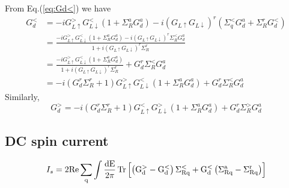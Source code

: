 \documentclass[11pt,a4paper]{article}
\begin{document}
From Eq.(\ref{eq:Gd<}) we have
\begin{equation}
\begin{split}
G_{d}^{<}&=-i G_{L \uparrow}^{>} G_{L \downarrow}^{<}\left(1+\Sigma_{R}^{a} G_{d}^{a}\right)-i\left(G_{L \uparrow} G_{L \downarrow}\right)^{r}\left(\Sigma_{q}^{<} G_{d}^{a}+\Sigma_{R}^{r} G_{d}^{<}\right)\\
&=\frac{-i G_{L \uparrow}^{>} G_{L \downarrow}^{<}\left(1+\Sigma_{R}^{a} G_{d}^{a}\right) - i\left(G_{L \uparrow} G_{L \downarrow}\right)^{r}\Sigma_{R}^{<} G_{d}^{a}}{1+i\left(G_{L \uparrow} G_{L \downarrow}\right)^{r}\Sigma_{R}^{r}} \\
&=\frac{-i G_{L \uparrow}^{>} G_{L \downarrow}^{<}\left(1+\Sigma_{R}^{a} G_{d}^{a}\right)}{1+i\left(G_{L \uparrow} G_{L \downarrow}\right)^{r}\Sigma_{R}^{r}} + G_{d}^{r}\Sigma_{R}^{<} G_{d}^{a}\\
&=-i(G_{d}^{r}\Sigma_{R}^{r}+1) G_{L \uparrow}^{>} G_{L \downarrow}^{<}\left(1+\Sigma_{R}^{a} G_{d}^{a}\right) + G_{d}^{r}\Sigma_{R}^{<} G_{d}^{a}
\end{split}
\end{equation}
Similarly,
\begin{equation}
G_{d}^{>}=-i\left(G_{d}^{r} \Sigma_{R}^{r}+1\right) G_{L \uparrow}^{<} G_{L \downarrow}^{>}\left(1+\Sigma_{R}^{a} G_{d}^{a}\right)+G_{d}^{r} \Sigma_{R}^{>} G_{d}^{a}
\end{equation}
\subsection{DC spin current}

\begin{equation}
I_{s}= 2\rm{Re}\sum_{q} \int  \frac{dE}{2\pi}\operatorname{Tr}\left[\left(G_{d}^{>}-G_{d}^{<}\right) \Sigma_{R q}^{<}+G_{d}^{<}\left(\Sigma_{R q}^{a}-\Sigma_{R q}^{r}\right)\right]
\end{equation}
\end{document}
